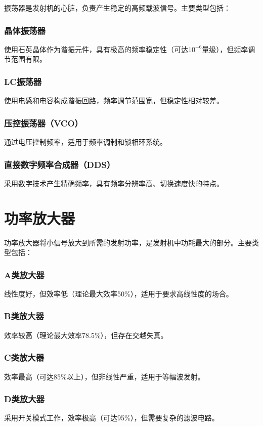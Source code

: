 \documentclass[12pt,UTF8]{ctexbook}
\begin{document}
振荡器是发射机的心脏，负责产生稳定的高频载波信号。主要类型包括：

\subsubsection{晶体振荡器}
使用石英晶体作为谐振元件，具有极高的频率稳定性（可达$10^{-6}$量级），但频率调节范围有限。

\subsubsection{LC振荡器}
使用电感和电容构成谐振回路，频率调节范围宽，但稳定性相对较差。

\subsubsection{压控振荡器（VCO）}
通过电压控制频率，适用于频率调制和锁相环系统。

\subsubsection{直接数字频率合成器（DDS）}
采用数字技术产生精确频率，具有频率分辨率高、切换速度快的特点。

\section{功率放大器}

功率放大器将小信号放大到所需的发射功率，是发射机中功耗最大的部分。主要类型包括：

\subsubsection{A类放大器}
线性度好，但效率低（理论最大效率50\%），适用于要求高线性度的场合。

\subsubsection{B类放大器}
效率较高（理论最大效率78.5\%），但存在交越失真。

\subsubsection{C类放大器}
效率最高（可达85\%以上），但非线性严重，适用于等幅波发射。

\subsubsection{D类放大器}
采用开关模式工作，效率极高（可达95\%），但需要复杂的滤波电路。
\end{document}
